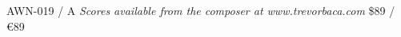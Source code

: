 \documentclass{article}
\begin{document}
\null \vfill

AWN-019 / A \hfill
\textit{Scores available from the composer at www.trevorbaca.com}
\hfill \$89 / \euro 89
\end{document}

